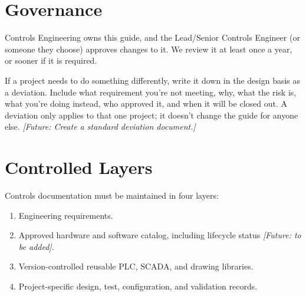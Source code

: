 \section{Governance}\label{sec:governance}
Controls Engineering owns this guide, and the Lead/Senior Controls Engineer (or someone they choose) approves changes to it. We review it at least once a year, or sooner if it is required.

If a project needs to do something differently, write it down in the design basis as a deviation. Include what requirement you're not meeting, why, what the risk is, what you're doing instead, who approved it, and when it will be closed out. A deviation only applies to that one project; it doesn't change the guide for anyone else.
\textit{\textcolor{futureblue}{[Future: Create a standard deviation document.]}}

\section{Controlled Layers}
Controls documentation must be maintained in four layers:
\begin{enumerate}[itemsep=2pt]
  \item Engineering requirements.
  \item Approved hardware and software catalog, including lifecycle status \textit{\textcolor{futureblue}{[Future: to be added]}}.
  \item Version-controlled reusable PLC, SCADA, and drawing libraries.
  \item Project-specific design, test, configuration, and validation records.
\end{enumerate}
